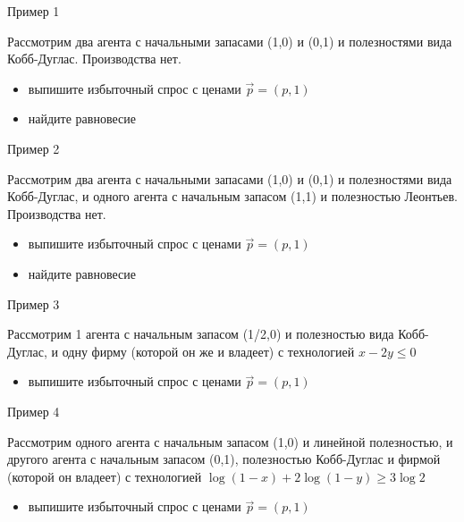 \documentclass{beamer}
\begin{document}
\begin{frame}{Пример 1}

Рассмотрим два агента с начальными запасами (1,0) и (0,1) и полезностями вида Кобб-Дуглас. Производства нет.

\begin{itemize}
  \item выпишите избыточный спрос с ценами $\vec p = (p,1)$
  \item найдите равновесие
\end{itemize}

\end{frame}

\begin{frame}{Пример 2}

Рассмотрим два агента с начальными запасами (1,0) и (0,1) и полезностями вида Кобб-Дуглас, и одного агента с начальным запасом (1,1) и полезностью Леонтьев. Производства нет.

\begin{itemize}
  \item выпишите избыточный спрос с ценами $\vec p = (p,1)$
  \item найдите равновесие
\end{itemize}

\end{frame}

\begin{frame}{Пример 3}

Рассмотрим 1 агента с начальным запасом (1/2,0) и полезностью вида Кобб-Дуглас, и одну фирму (которой он же и владеет) с технологией $x - 2y \leqslant 0$
\begin{itemize}
  \item выпишите избыточный спрос с ценами $\vec p = (p,1)$
\end{itemize}

\end{frame}

\begin{frame}{Пример 4}

Рассмотрим одного агента с начальным запасом (1,0) и линейной полезностью, и другого агента с начальным запасом (0,1), полезностью Кобб-Дуглас и фирмой (которой он владеет) с технологией $\log(1-x) + 2\log(1-y) \geqslant 3 \log 2$
\begin{itemize}
  \item выпишите избыточный спрос с ценами $\vec p = (p,1)$
\end{itemize}

\end{frame}
\end{document}
